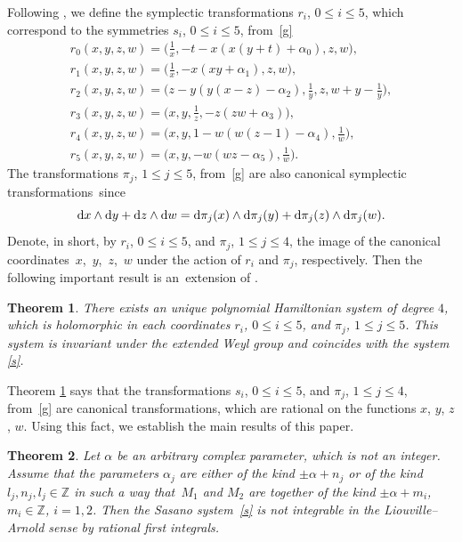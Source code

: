 \documentclass[pdftex]{sigma}
\numberwithin{equation}{section}
\newtheorem{Theorem}{Theorem}[section]
\begin{document}
 Following \cite{SY}, we define the symplectic transformations $r_i$, $0 \leq i \leq 5$, which correspond to the symmetries
 $s_i$, $0 \leq i \leq 5$, from~\eqref{g}
 \begin{gather*}
 r_0(x, y, z, w) =
 \biggl(\frac{1}{x}, -t - x (x (y+t) + \alpha_0), z, w\biggr),\\
 r_1(x, y, z, w) =
 \biggl(\frac{1}{x}, -x (x y + \alpha_1), z, w\biggr),\\
 r_2(x, y, z, w) =
 \biggl(z- y (y (x-z) -\alpha_2), \frac{1}{y}, z, w+y - \frac{1}{y}\biggr),\\
 r_3(x, y, z, w) =
 \biggl(x, y, \frac{1}{z}, -z (z w + \alpha_3)\biggr),\\
 r_4(x, y, z, w) =
 \biggl(x, y, 1-w (w (z-1) - \alpha_4), \frac{1}{w}\biggr),\\
 r_5(x, y, z, w) =
 \biggl(x, y, -w (w z - \alpha_5), \frac{1}{w}\biggr) .
 \end{gather*}
 The transformations $\pi_j$, $1 \leq j \leq 5$, from~\eqref{g} are also canonical symplectic transformations~since
 \[
 {\rm d}x \wedge {\rm d} y + {\rm d} z \wedge {\rm d} w={\rm d} \pi_j(x) \wedge {\rm d} \pi_j(y) + {\rm d} \pi_j (z) \wedge {\rm d} \pi_j(w) .
 \]
 Denote, in short, by $r_i$, $0 \leq i \leq 5$, and $\pi_j$, $1 \leq j \leq 4$, the image of the
 canonical coordinates~$x$,~$y$,~$z$,~$w$ under the action of $r_i$ and $\pi_j$, respectively.
 Then the following important result is an~extension of \cite[Theorem 4.1]{SY}.

 \begin{Theorem}\label{bct}
 There exists an unique polynomial Hamiltonian system of degree $4$, which is holomorphic in each coordinates
 $r_i$, $0 \leq i \leq 5$, and $\pi_j$, $1 \leq j \leq 5$. This system is invariant under the extended Weyl group
 and coincides with the system
 \eqref{s}.
 \end{Theorem}

 Theorem \ref{bct} says that the transformations $s_i$, $0 \leq i \leq 5$, and $\pi_j$, $1 \leq j \leq 4$, from~\eqref{g} are
 canonical transformations, which are rational on the functions $x$, $y$, $z$, $w$. Using this fact, we establish the main results of this
 paper.

 \begin{Theorem}\label{1}
 Let $\alpha$ be an arbitrary complex parameter, which is not an integer. Assume that the parameters $\alpha_j$ are either of the kind
 $\pm \alpha + n_j$ or of the kind $l_j, n_j, l_j\in\mathbb{Z}$ in such a way that~$M_1$ and
 $M_2$ are together of the kind $\pm \alpha + m_i$, $m_i\in\mathbb{Z}$, $i=1, 2$. Then the Sasano system~\eqref{s} is not integrable in the Liouville--Arnold sense by rational first integrals.
 \end{Theorem}
\end{document}
